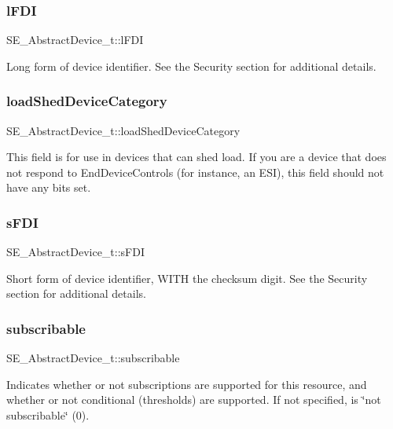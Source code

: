 \subsubsection{\texorpdfstring{l\+F\+DI}{lFDI}}
{\footnotesize\ttfamily S\+E\+\_\+\+Abstract\+Device\+\_\+t\+::l\+F\+DI}

Long form of device identifier. See the Security section for additional details. \mbox{\label{group__AbstractDevice_ga865ceb516365a2ee32b0c7bfe114dbc0}} 
\subsubsection{\texorpdfstring{load\+Shed\+Device\+Category}{loadShedDeviceCategory}}
{\footnotesize\ttfamily S\+E\+\_\+\+Abstract\+Device\+\_\+t\+::load\+Shed\+Device\+Category}

This field is for use in devices that can shed load. If you are a device that does not respond to End\+Device\+Controls (for instance, an E\+SI), this field should not have any bits set. \mbox{\label{group__AbstractDevice_ga696fa49a4a1e6f84ad0ebe683906fa77}} 
\subsubsection{\texorpdfstring{s\+F\+DI}{sFDI}}
{\footnotesize\ttfamily S\+E\+\_\+\+Abstract\+Device\+\_\+t\+::s\+F\+DI}

Short form of device identifier, W\+I\+TH the checksum digit. See the Security section for additional details. \mbox{\label{group__AbstractDevice_ga45b4dabefeecfb3f2e517060d8e025b6}} 
\subsubsection{\texorpdfstring{subscribable}{subscribable}}
{\footnotesize\ttfamily S\+E\+\_\+\+Abstract\+Device\+\_\+t\+::subscribable}

Indicates whether or not subscriptions are supported for this resource, and whether or not conditional (thresholds) are supported. If not specified, is \char`\"{}not subscribable\char`\"{} (0). 
